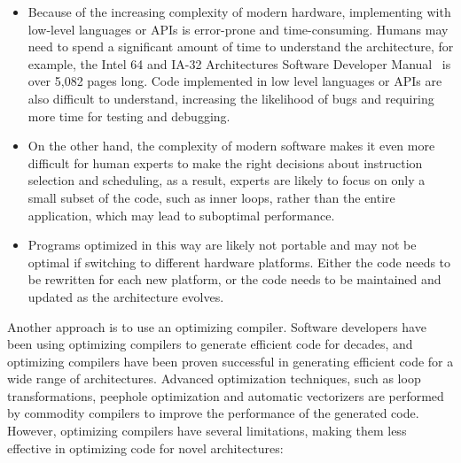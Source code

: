 \begin{itemize}
%
\item Because of the increasing complexity of modern hardware,
implementing with low-level languages or APIs is error-prone and
time-consuming. Humans may need to spend a significant amount of time
to understand the architecture, for example, the Intel 64 and IA-32
Architectures Software Developer Manual~\cite{intelmanual} is over
5,082 pages long.
%
Code implemented in low level languages or APIs are also difficult to
understand, increasing the likelihood of bugs and requiring more time
for testing and debugging.

\item On the other hand, the complexity of modern software makes it even
more difficult for human experts to make the right decisions about
instruction selection and scheduling, as a result, experts are likely
to focus on only a small subset of the code, such as inner loops,
rather than the entire application, which may lead to suboptimal
performance.

\item Programs optimized in this way are likely not portable and
may not be optimal if switching to different hardware platforms.
%
Either the code needs to be rewritten for each new platform, or the
code needs to be maintained and updated as the architecture evolves.

\end{itemize}


Another approach is to use an optimizing compiler.
%
Software developers have been using optimizing compilers to generate
efficient code for decades, and optimizing compilers have been proven
successful in generating efficient code for a wide range of
architectures.
%
Advanced optimization techniques, such as loop transformations,
peephole optimization and automatic vectorizers are performed by
commodity compilers to improve the performance of the generated code.
%
However, optimizing compilers have several limitations, making them
less effective in optimizing code for novel architectures:

